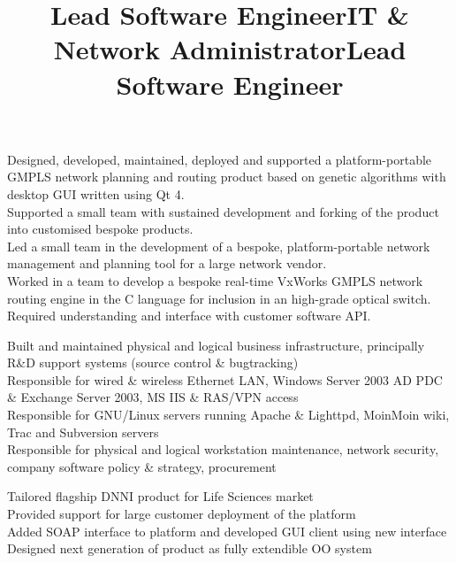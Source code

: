 \documentclass{resume}
\begin{document}
\begin{resume}
\title{\bf{Lead Software Engineer}}
\begin{position}
Designed, developed, maintained, deployed and supported a platform-portable GMPLS network planning and routing product based on genetic algorithms with desktop GUI written using Qt 4. \vspace{1mm}\\
Supported a small team with sustained development and forking of the product into customised bespoke products. \vspace{1mm}\\
Led a small team in the development of a bespoke, platform-portable network management and planning tool for a large network vendor.\vspace{1mm}\\
Worked in a team to develop a bespoke real-time VxWorks GMPLS network routing engine in the C language for inclusion in an high-grade optical switch.  Required understanding and interface with customer software API.
\end{position}

\title{\bf IT \& Network Administrator}
\begin{position}
Built and maintained physical and logical business infrastructure, principally R\&D support systems (source control \& bugtracking) \vspace{1mm}\\
Responsible for wired \& wireless Ethernet LAN, Windows Server 2003 AD PDC \& Exchange Server 2003, MS IIS \& RAS/VPN access \vspace{1mm}\\
Responsible for GNU/Linux servers running Apache \& Lighttpd, MoinMoin wiki, Trac and Subversion servers \vspace{1mm}\\
Responsible for physical and logical workstation maintenance, network security, company software policy \& strategy, procurement 
\end{position}

\title{\bf Lead Software Engineer}
\begin{position}
Tailored flagship DNNI product for Life Sciences market  \vspace{1mm}\\
Provided support for large customer deployment of the platform  \vspace{1mm}\\
Added SOAP interface to platform and developed GUI client using new interface  \vspace{1mm}\\
Designed next generation of product as fully extendible OO system
\end{position}


\end{resume}
\end{document}
